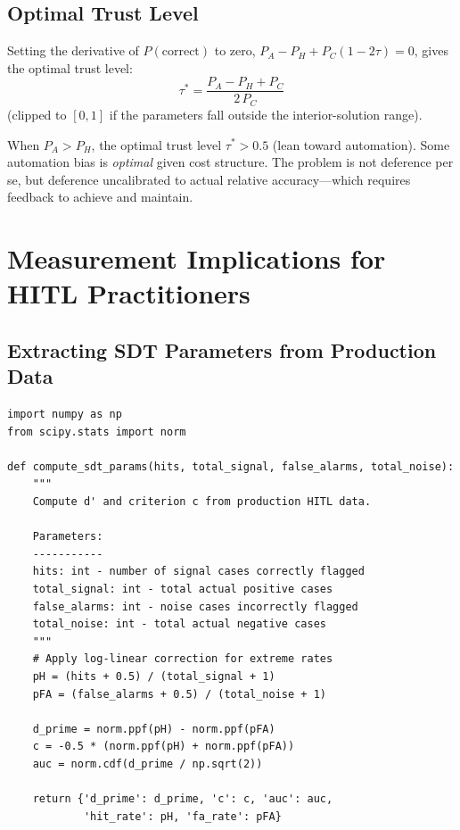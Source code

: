 \subsection{Optimal Trust Level}

Setting the derivative of $P(\text{correct})$ to zero, $P_A - P_H + P_C(1 - 2\tau) = 0$, gives the optimal trust level:
\[
\tau^* = \frac{P_A - P_H + P_C}{2\,P_C}
\]
(clipped to $[0,1]$ if the parameters fall outside the interior-solution range).

\begin{keyconcept}
When $P_A > P_H$, the optimal trust level $\tau^* > 0.5$ (lean toward automation). Some automation bias is \emph{optimal} given cost structure. The problem is not deference per se, but deference uncalibrated to actual relative accuracy---which requires feedback to achieve and maintain.
\end{keyconcept}

\section{Measurement Implications for HITL Practitioners}

\subsection{Extracting SDT Parameters from Production Data}

\begin{lstlisting}[style=python, caption={SDT parameter extraction from HITL logs}]
import numpy as np
from scipy.stats import norm

def compute_sdt_params(hits, total_signal, false_alarms, total_noise):
    """
    Compute d' and criterion c from production HITL data.

    Parameters:
    -----------
    hits: int - number of signal cases correctly flagged
    total_signal: int - total actual positive cases
    false_alarms: int - noise cases incorrectly flagged
    total_noise: int - total actual negative cases
    """
    # Apply log-linear correction for extreme rates
    pH = (hits + 0.5) / (total_signal + 1)
    pFA = (false_alarms + 0.5) / (total_noise + 1)

    d_prime = norm.ppf(pH) - norm.ppf(pFA)
    c = -0.5 * (norm.ppf(pH) + norm.ppf(pFA))
    auc = norm.cdf(d_prime / np.sqrt(2))

    return {'d_prime': d_prime, 'c': c, 'auc': auc,
            'hit_rate': pH, 'fa_rate': pFA}
\end{lstlisting}

